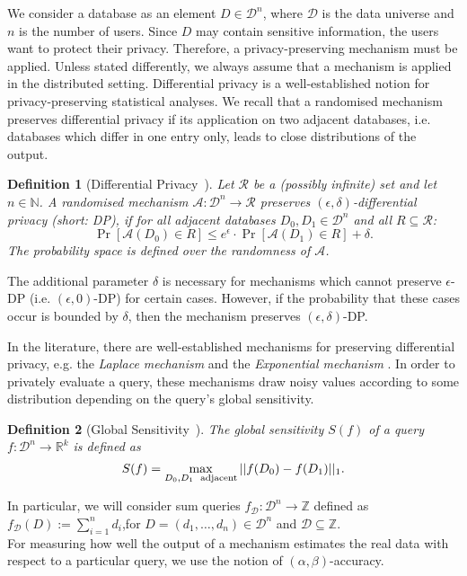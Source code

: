 \documentclass[10pt]{extarticle}
\newtheorem{Def}{Definition}
\begin{document}
We consider a database as an element $D\in\mathcal{D}^n$, where $\mathcal{D}$ is the data universe and $n$ is the number of users. Since $D$ may contain sensitive information, the users want to protect their privacy. Therefore, a privacy-preserving mechanism must be applied. Unless stated differently, we always assume that a mechanism is applied in the distributed setting. Differential privacy \cite{8} is a well-established notion for privacy-preserving statistical analyses. We recall that a randomised mechanism preserves differential privacy if its application on two adjacent databases, i.e. databases which differ in one entry only, leads to close distributions of the output.

\begin{Def}[Differential Privacy~\cite{8}]
Let $\mathcal{R}$ be a (possibly infinite) set and let $n\in\mathbb{N}$. A randomised mechanism $\mathcal{A}:\mathcal{D}^n\to\mathcal{R}$ preserves $(\epsilon,\delta)$-differential privacy (short: \mbox{\upshape\sffamily DP}), if for all adjacent databases $D_0, D_1\in\mathcal{D}^n$ and all $R\subseteq\mathcal{R}$:
\[\Pr[\mathcal{A}(D_0)\in R]\leq e^\epsilon\cdot \Pr[\mathcal{A}(D_1)\in R]+\delta.\]
The probability space is defined over the randomness of $\mathcal{A}$.
\end{Def}

The additional parameter $\delta$ is necessary for mechanisms which cannot preserve $\epsilon$-\mbox{\upshape\sffamily DP} (i.e. $(\epsilon,0)$-\mbox{\upshape\sffamily DP}) for certain cases. However, if the probability that these cases occur is bounded by $\delta$, then the mechanism preserves $(\epsilon,\delta)$-\mbox{\upshape\sffamily DP}.

In the literature, there are well-established mechanisms for preserving differential privacy, e.g. the \textit{Laplace mechanism} \cite{8} and the \textit{Exponential mechanism} \cite{9}. In order to privately evaluate a query, these mechanisms draw noisy values according to some distribution depending on the query's global sensitivity.


\begin{Def}[Global Sensitivity~\cite{8}]
The global sensitivity $S(f)$ of a query\linebreak $f:\mathcal{D}^n\to\mathbb{R}^k$ is defined as
\[S(f)=\max_{D_0,D_1\mbox{\scriptsize \,\, adjacent}}||f(D_0)-f(D_1)||_1.\]
\end{Def}

In particular, we will consider sum queries $f_{\mathcal{D}}:\mathcal{D}^n\to\mathbb{Z}$ defined as $f_{\mathcal{D}}(D):=\sum_{i=1}^n d_i$,\linebreak for $D=(d_1,\ldots,d_n)\in\mathcal{D}^n$ and $\mathcal{D}\subseteq\mathbb{Z}$.\\
For measuring how well the output of a mechanism estimates the real data with respect to a particular query, we use the notion of $(\alpha,\beta)$-accuracy.
\end{document}
